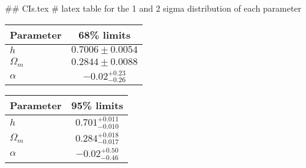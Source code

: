 ## CIs.tex
# latex table for the 1 and 2 sigma distribution of each parameter

\begin{tabular} { l  c}
 Parameter &  68\% limits\\
\hline
{\boldmath$h              $} & $0.7006\pm 0.0054          $\\
{\boldmath$\Omega_m       $} & $0.2844\pm 0.0088          $\\
{\boldmath$\alpha         $} & $-0.02^{+0.23}_{-0.26}     $\\
\hline
\end{tabular}

\begin{tabular} { l  c}
 Parameter &  95\% limits\\
\hline
{\boldmath$h              $} & $0.701^{+0.011}_{-0.010}   $\\
{\boldmath$\Omega_m       $} & $0.284^{+0.018}_{-0.017}   $\\
{\boldmath$\alpha         $} & $-0.02^{+0.50}_{-0.46}     $\\
\hline
\end{tabular}
